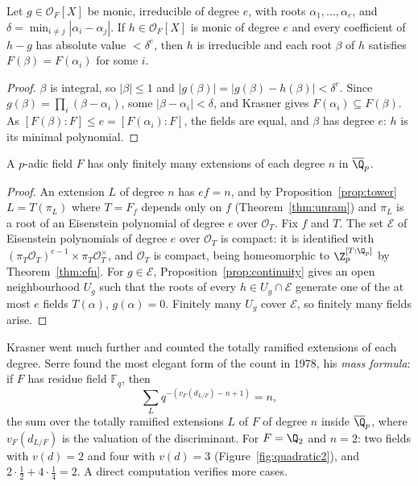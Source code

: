\begin{proposition}\label{prop:continuity}
Let $g\in\mathcal O_F[X]$ be monic, irreducible of degree $e$, with roots $\alpha_1,\dots,\alpha_e$, and $\delta=\min_{i\ne j}
|\alpha_i-\alpha_j|$. If $h\in\mathcal O_F[X]$ is monic of degree $e$ and every coefficient of $h-g$ has absolute value $<\delta^e$,
then $h$ is irreducible and each root $\beta$ of $h$ satisfies $F(\beta)=F(\alpha_i)$ for some $i$.
\end{proposition}
\begin{proof}
$\beta$ is integral, so $|\beta|\le1$ and $|g(\beta)|=|g(\beta)-h(\beta)|<\delta^e$. Since $g(\beta)=\prod_i(\beta-\alpha_i)$, some
$|\beta-\alpha_i|<\delta$, and Krasner gives $F(\alpha_i)\subseteq F(\beta)$. As $[F(\beta):F]\le e=[F(\alpha_i):F]$, the fields
are equal, and $\beta$ has degree $e$: $h$ is its minimal polynomial.
\end{proof}

\begin{theorem}\label{thm:finitelymany}
A $p$-adic field $F$ has only finitely many extensions of each degree $n$ in $\overline{\Q}_p$.
\end{theorem}
\begin{proof}
An extension $L$ of degree $n$ has $ef=n$, and by Proposition~\ref{prop:tower} $L=T(\pi_L)$ where $T=F_f$ depends only on $f$
(Theorem~\ref{thm:unram}) and $\pi_L$ is a root of an Eisenstein polynomial of degree $e$ over $\mathcal O_T$. Fix $f$ and $T$.
The set $\mathcal E$ of Eisenstein polynomials of degree $e$ over $\mathcal O_T$ is compact: it is identified with
$(\pi_T\mathcal O_T)^{e-1}\times\pi_T\mathcal O_T^\times$, and $\mathcal O_T$ is compact, being homeomorphic to $\Z_p^{[T:\Q_p]}$ by
Theorem~\ref{thm:efn}. For $g\in\mathcal E$, Proposition~\ref{prop:continuity} gives an open neighbourhood $U_g$ such that the
roots of every $h\in U_g\cap\mathcal E$ generate one of the at most $e$ fields $T(\alpha)$, $g(\alpha)=0$. Finitely many $U_g$
cover $\mathcal E$, so finitely many fields arise.
\end{proof}

\begin{remark}
Krasner went much further and counted the totally ramified extensions of each degree. Serre found the most elegant form of
the count in 1978, his \emph{mass formula}: if $F$ has residue field $\mathbb F_q$, then
\[
\sum_L q^{-(v_F(d_{L/F})-n+1)}=n,
\]
the sum over the totally ramified extensions $L$ of $F$ of degree $n$ inside $\overline{\Q}_p$, where $v_F(d_{L/F})$ is the
valuation of the discriminant. For $F=\Q_2$ and $n=2$: two fields with $v(d)=2$ and four with $v(d)=3$
(Figure~\ref{fig:quadratic2}), and $2\cdot\frac12+4\cdot\frac14=2$. A direct computation verifies more cases.
\end{remark}

